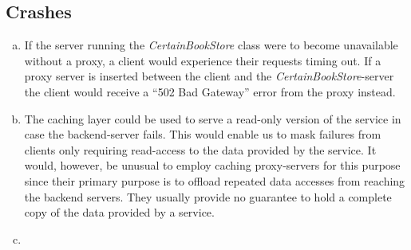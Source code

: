 \documentclass[11pt,a4paper,english]{article}
\begin{document}
\subsection{Crashes}

\begin{enumerate}[(a)]
\item If the server running the \textit{CertainBookStore} class were to become
  unavailable without a proxy, a client would experience their requests timing
  out. If a proxy server is inserted between the client and the
  \textit{CertainBookStore}-server the client would receive a ``502 Bad
  Gateway'' error from the proxy instead.
\item The caching layer could be used to serve a read-only version of the
  service in case the backend-server fails. This would enable us to mask
  failures from clients only requiring read-access to the data provided by the
  service. It would, however, be unusual to employ caching proxy-servers for
  this purpose since their primary purpose is to offload repeated data accesses
  from reaching the backend servers. They usually provide no guarantee to hold a
  complete copy of the data provided by a service.
\item 
\end{enumerate}


%
%



\end{document}

